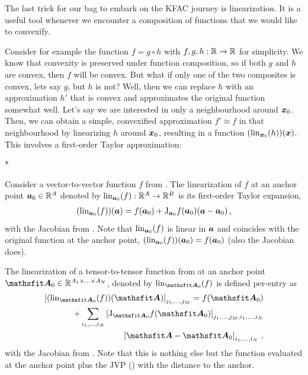 The last trick for our bag to embark on the KFAC journey is linearization.
It is a useful tool whenever we encounter a composition of functions that we would like to convexify.

Consider for example the function $f = g \circ h$ with $f,g,h: {\mathbb{R}} \to {\mathbb{R}}$ for simplicity.
We know that convexity is preserved under function composition, so if both $g$ and $h$ are convex, then $f$ will be convex.
But what if only one of the two composites is convex, lets say $g$, but $h$ is not?
Well, then we can replace $h$ with an approximation $h'$ that is convex and approximates the original function somewhat well.
Let's say we are interested in only a neighbourhood around ${\bm{x}}_0$.
Then, we can obtain a simple, convexified approximation $f' \approx f$ in that neighbourhood by linearizing $h$ around ${\bm{x}}_0$, resulting in a function $(\operatorname{lin}_{{\bm{x}}_0}(h))({\bm{x}})$.
This involves a first-order Taylor approximation:

\switchcolumn[1]*
\switchcolumn[0]

\begin{definition}\label{def:vector_linearization}
  Consider a vector-to-vector function $f$ from .
  The linearization of $f$ at an anchor point ${\bm{a}}_0 \in {\mathbb{R}}^A$ denoted by $\operatorname{lin}_{{\bm{a}}_0}(f): {\mathbb{R}}^A \to {\mathbb{R}}^B$ is its first-order Taylor expansion,
  \begin{align*}
    (\operatorname{lin}_{{\bm{a}}_0}(f))({\bm{a}}) = f({\bm{a}}_0) + \mathrm{J}_{{\bm{a}}_0}f({\bm{a}}_0) ({\bm{a}} - {\bm{a}}_0)\,,
  \end{align*}
  with the Jacobian from .
  Note that $\operatorname{lin}_{{\bm{a}}_0}(f)$ is linear in ${\bm{a}}$ and coincides with the original function at the anchor point, $(\operatorname{lin}_{{\bm{a}}_0}(f))({\bm{a}}_0) = f({\bm{a}}_0)$ (also the Jacobian does).
\end{definition}

\begin{definition}\label{def:tensor_linearization}
  The linearization of a tensor-to-tensor function from  at an anchor point $\tA_0 \in \sR^{A_1 \times \ldots \times A_N}$, denoted by $\lin_{\tA_0}(f)$ is defined per-entry as
  \begin{align*}
    \left[
    (\lin_{\tA_0}(f))(\tA)
    \right]_{j_1, \ldots, j_M}
    = f(\tA_0)
    \\
    +
    \sum_{i_1, \ldots, i_N}
    \left[
    \jac_{\tA_0}f(\tA_0)
    \right]_{j_1, \ldots, j_M, i_1, \ldots, i_N}
    \\
    \left[
    \tA - \tA_0
    \right]_{i_1, \ldots, i_N}\,,
  \end{align*}
  with the Jacobian from . Note that this is nothing else but the function evaluated at the anchor point plus the JVP () with the distance to the anchor.
\end{definition}

